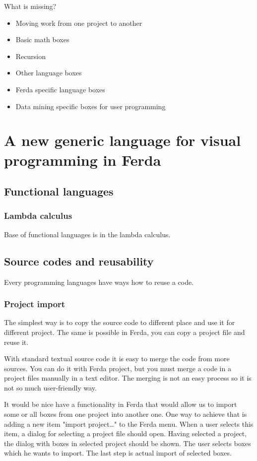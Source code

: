 \documentclass[a4paper,12pt]{book}
\begin{document}
What is missing?
\begin{itemize}
	\item Moving work from one project to another
	\item Basic math boxes
	\item Recursion
	\item Other language boxes
	\item Ferda specific language boxes
	\item Data mining specific boxes for user programming
\end{itemize}

\chapter{A new generic language for visual programming in Ferda}
\section{Functional languages}

\subsection{Lambda calculus}
Base of functional languages is in the lambda calculus. 

\section{Source codes and reusability}
Every programming languages have ways how to reuse a code. 

\subsection{Project import}
The simplest way is to copy the source code to different place and use it for different project. The same is possible in Ferda, you can copy a project file and reuse it.

With standard textual source code it is easy to merge the code from more sources. You can do it with Ferda project, but you must merge a code in a project files manually in a text editor. The merging is not an easy process so it is not so much user-friendly way.

It would be nice have a functionality in Ferda that would allow us to import some or all boxes from one project into another one. One way to achieve that is adding a new item "import project\dots" to the Ferda menu. When a user selects this item, a dialog for selecting a project file should open. Having selected a project, the dialog with boxes in selected project should be shown. The user selects boxes which he wants to import. The last step is actual import of selected boxes.
\end{document}
